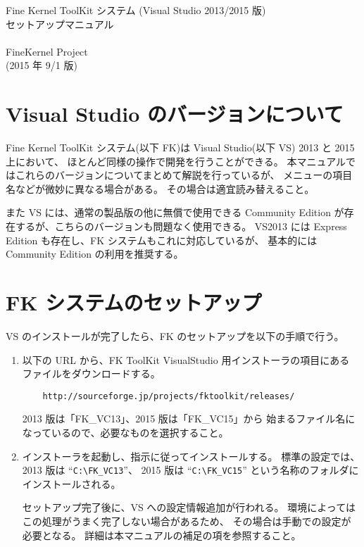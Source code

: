 \documentclass[a4j]{jarticle}
\begin{document}
\begin{center}
{\Large Fine Kernel ToolKit システム (Visual Studio 2013/2015 版) \\
	セットアップマニュアル} \\ ~ \\
{\Large FineKernel Project} \\
(2015 年 9/1 版)
\end{center}


\section{Visual Studio のバージョンについて}
Fine Kernel ToolKit システム(以下 FK)は 
Visual Studio(以下 VS) 2013 と 2015 上において、
ほとんど同様の操作で開発を行うことができる。
本マニュアルではこれらのバージョンについてまとめて解説を行っているが、
メニューの項目名などが微妙に異なる場合がある。
その場合は適宜読み替えること。

また VS には、通常の製品版の他に無償で使用できる 
Community Edition が存在するが、こちらのバージョンも問題なく使用できる。
VS2013 には Express Edition も存在し、FK システムもこれに対応しているが、
基本的には Community Edition の利用を推奨する。

\section{FK システムのセットアップ}
VS のインストールが完了したら、FK のセットアップを以下の手順で行う。

\begin{enumerate}
\item 以下の URL から、FK ToolKit VisualStudio 用インストーラの項目にある
ファイルをダウンロードする。

\begin{verbatim}
    http://sourceforge.jp/projects/fktoolkit/releases/
\end{verbatim}

2013 版は「FK\_VC13」、2015 版は「FK\_VC15」から
始まるファイル名になっているので、必要なものを選択すること。

\item インストーラを起動し、指示に従ってインストールする。
標準の設定では、2013 版は ``\verb+C:\FK_VC13+''、
2015 版は ``\verb+C:\FK_VC15+'' という名称のフォルダにインストールされる。

セットアップ完了後に、VS への設定情報追加が行われる。
環境によってはこの処理がうまく完了しない場合があるため、
その場合は手動での設定が必要となる。
詳細は本マニュアルの補足の項を参照すること。


\end{enumerate}
\end{document}
